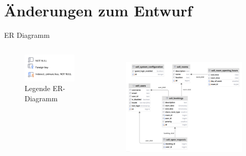 \documentclass{sdqbeamer}
\begin{document}
    \section{Änderungen zum Entwurf}
    \begin{frame}{ER Diagramm}
        \thispagestyle{plain}
    \begin{columns}
        \begin{figure}
           
            \centering
        \includegraphics[width=1\linewidth]{ERLegend.png}
    \caption{Legende ER-Diagramm}
        \label{fig:enter-label}
        \end{figure}
         \begin{figure}
            \centering
            \includegraphics[width=0.75\linewidth]{database_new.png}
            \label{fig:enter-label}
        \end{figure}
    \end{columns}
    
    
       
    \end{frame}
    
\end{document}
